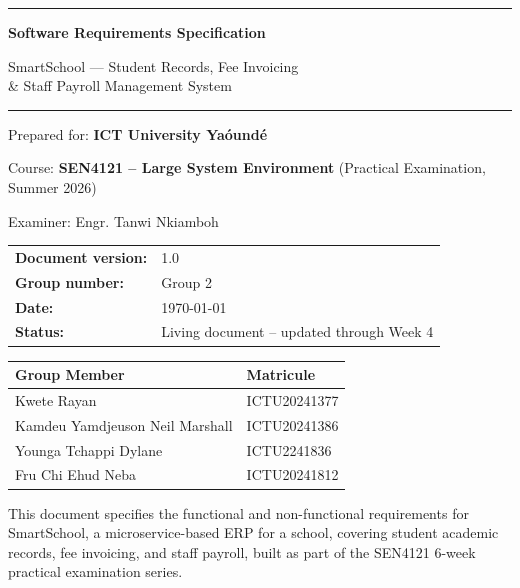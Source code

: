 \documentclass[11pt,a4paper]{report}
\newcommand{\sysname}{SmartSchool}
\begin{document}
\begin{titlepage}
\begin{center}
\vspace*{1.2cm}

{\color{primary}\rule{\linewidth}{2pt}}

\vspace{0.8cm}
{\Huge\bfseries\color{primary} Software Requirements Specification}

\vspace{0.4cm}
{\LARGE\color{primarydark} \sysname{} --- Student Records, Fee Invoicing\\[2pt] \& Staff Payroll Management System}

\vspace{0.6cm}
{\color{primary}\rule{\linewidth}{2pt}}

\vspace{2cm}

{\Large Prepared for: \textbf{ICT University Ya\'ound\'e}}

\vspace{0.3cm}
{\large Course: \textbf{SEN4121 -- Large System Environment} \quad (Practical Examination, Summer 2026)}

\vspace{0.3cm}
{\large Examiner: Engr. Tanwi Nkiamboh}

\vspace{1.5cm}

\begin{tabular}{ll}
\textbf{Document version:} & 1.0 \\[4pt]
\textbf{Group number:} & Group 2 \\[4pt]
\textbf{Date:} & \today \\[4pt]
\textbf{Status:} & Living document -- updated through Week 4 \\
\end{tabular}

\vspace{1cm}

\begin{tabular}{@{}p{6cm}p{4.5cm}@{}}
\toprule
\textbf{Group Member} & \textbf{Matricule} \\
\midrule
Kwete Rayan & ICTU20241377 \\
Kamdeu Yamdjeuson Neil Marshall & ICTU20241386 \\
Younga Tchappi Dylane & ICTU2241836 \\
Fru Chi Ehud Neba & ICTU20241812 \\
\bottomrule
\end{tabular}

\vfill

{\small\color{bodytext} This document specifies the functional and non-functional
requirements for \sysname{}, a microservice-based ERP for a school, covering
student academic records, fee invoicing, and staff payroll, built as part of
the SEN4121 6-week practical examination series.}

\end{center}
\end{titlepage}
\end{document}
